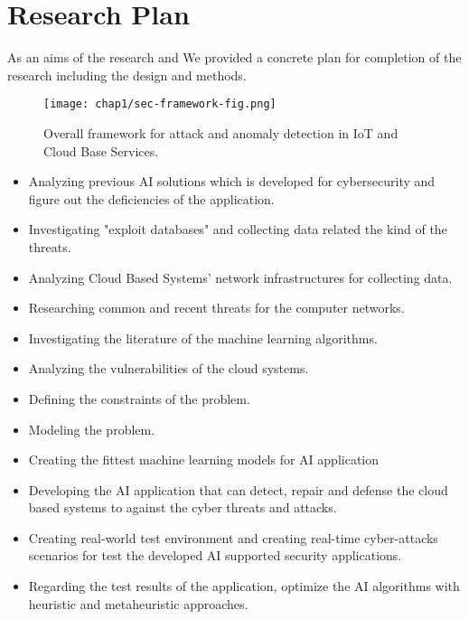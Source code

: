 \section{Research Plan}

 As an aims of the research and We provided a concrete plan for completion of the research including the design and 
 methods.

\begin{figure}[ht]
   \center
   \texttt{[image: chap1/sec-framework-fig.png]} 
   \caption{Overall framework for attack and anomaly detection in IoT and Cloud Base Services.}
   \label{fig-example}
\end{figure}

\begin{itemize}
   \item {
       Analyzing previous AI solutions which is developed for cybersecurity and figure out the deficiencies of the application. 
    }
   
    \item{
       Investigating "exploit databases" and collecting data related the kind of the threats.  
    }
    \item {
       Analyzing Cloud Based Systems' network infrastructures for collecting data. 
    }
   
    \item {
       Researching common and recent threats for the computer networks.
    }

    \item {
       Investigating the literature of the machine learning algorithms. 
   }
   \item {
       Analyzing the vulnerabilities of the cloud systems.   
   }

    \item {
       Defining the constraints of the problem.
    }

    \item {
       Modeling the problem. 
    }
    \item {
       Creating the fittest machine learning models for AI application 
    }
    \item {
       Developing the AI application that can detect, repair and defense the cloud based systems to against the cyber threats and attacks.
    }
   \item {
       Creating real-world test environment and creating real-time cyber-attacks scenarios for test the developed AI supported security applications.
   }

   \item {
       Regarding the test results of the application, optimize the AI algorithms with heuristic and metaheuristic approaches.  
   }

\end{itemize}